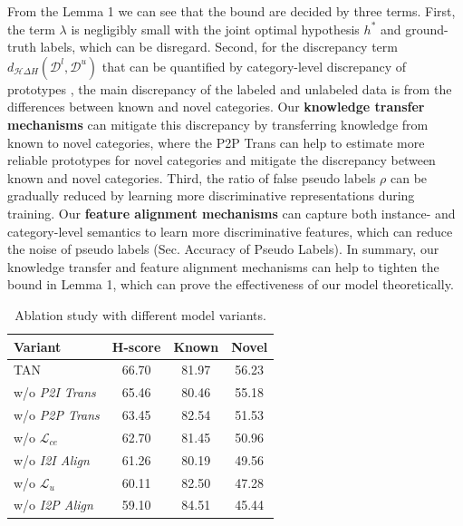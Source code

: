 \documentclass[letterpaper]{article} %
\begin{document}
From the Lemma 1 we can see that the bound are decided by three terms. First, the term $\lambda$ is negligibly small with the joint optimal hypothesis $h^*$ and ground-truth labels, which can be disregard. Second, for the discrepancy term $d_{\mathcal{H}\Delta{H}}(\mathcal{D}^l,\mathcal{D}^u)$ that can be quantified by category-level discrepancy of prototypes \citep{proto3}, the main discrepancy of the labeled and unlabeled data is from the differences between known and novel categories.
Our \textbf{knowledge transfer mechanisms} can mitigate this discrepancy by transferring knowledge from known to novel categories, where the P2P Trans can help to estimate more reliable prototypes for novel categories and mitigate the discrepancy between known and novel categories. Third, the ratio of false pseudo labels $\rho$ can be gradually reduced by learning more discriminative representations during training. Our \textbf{feature alignment mechanisms} can capture both instance- and category-level semantics to learn more discriminative features, which can reduce the noise of pseudo labels (Sec. Accuracy of Pseudo Labels). In summary, our knowledge transfer and feature alignment mechanisms can help to tighten the bound in Lemma 1, which can prove the effectiveness of our model theoretically.



\begin{table}
\setlength\tabcolsep{10pt}
\centering
\begin{tabular}{lccc}
\toprule
Variant & H-score & Known & Novel \\
\midrule
TAN & 66.70 & 81.97 & 56.23\\
\midrule
w/o \textit{P2I Trans}    & 65.46 & 80.46 & 55.18 \\
w/o \textit{P2P Trans}    & 63.45 & 82.54 & 51.53 \\
w/o $\mathcal{L}_{ce}$    & 62.70 & 81.45 & 50.96 \\
w/o \textit{I2I Align}    & 61.26 & 80.19 & 49.56 \\
w/o $\mathcal{L}_{u}$     & 60.11 & 82.50 & 47.28 \\
w/o \textit{I2P Align}    & 59.10 & 84.51 & 45.44 \\
\bottomrule

\end{tabular}
\caption{Ablation study with different model variants.}
\label{table2}
\end{table}
\end{document}
